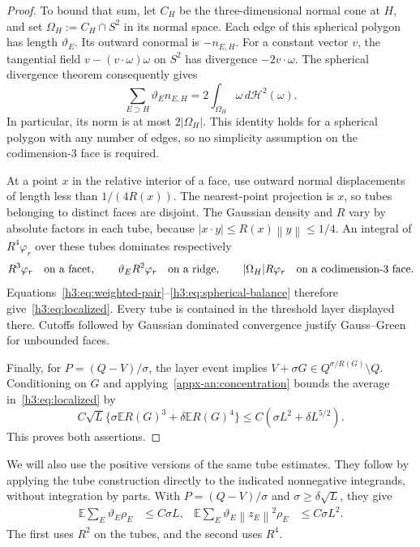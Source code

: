 \documentclass[11pt,letterpaper]{article}
\theoremstyle{remark}
\newcommand{\E}{\mathbb E}
\newcommand{\norm}[1]{\left\lVert#1\right\rVert}
\newcommand{\dd}{\,d}
\begin{document}
\begin{proof}
To bound that sum, let $C_H$ be the three-dimensional normal cone at
$H$, and set $\Omega_H:=C_H\cap S^2$ in its normal space. Each edge
of this spherical polygon has length $\vartheta_E$. Its outward
conormal is $-n_{E,H}$. For a constant vector $v$, the tangential
field $v-(v\cdot\omega)\omega$ on $S^2$ has divergence
$-2v\cdot\omega$. The spherical divergence theorem consequently gives
\begin{equation}
 \sum_{E\supset H}\vartheta_E n_{E,H}
 =2\int_{\Omega_H}\omega\dd\mathcal H^2(\omega).
 \label{h3:eq:spherical-balance}
\end{equation}
In particular, its norm is at most $2|\Omega_H|$. This identity holds
for a spherical polygon with any number of edges, so no simplicity
assumption on the codimension-$3$ face is required.

At a point $x$ in the relative interior of a face, use outward normal
displacements of length less than $1/(4R(x))$. The nearest-point
projection is $x$, so tubes belonging to distinct faces are disjoint.
The Gaussian density and $R$ vary by absolute factors in each tube,
because $|x\cdot y|\le R(x)\norm y\le1/4$.
An integral of $R^4\varphi_r$ over these tubes dominates respectively
\[
 R^3\varphi_r\quad\hbox{on a facet},\qquad
 \vartheta_E R^2\varphi_r\quad\hbox{on a ridge},\qquad
 |\Omega_H|R\varphi_r\quad\hbox{on a codimension-$3$ face}.
\]
Equations~\eqref{h3:eq:weighted-pair}--\eqref{h3:eq:spherical-balance}
therefore give~\eqref{h3:eq:localized}. Every tube is contained in the
threshold layer displayed there. Cutoffs followed by Gaussian dominated
convergence justify Gauss--Green for unbounded faces.

Finally, for $P=(Q-V)/\sigma$, the layer event implies
$V+\sigma G\in Q^{\sigma/R(G)}\setminus Q$.
Conditioning on $G$ and applying~\eqref{appx-an:concentration} bounds
the average in~\eqref{h3:eq:localized} by
\[
 C\sqrt L\{\sigma\E R(G)^3+\delta\E R(G)^4\}
 \le C(\sigma L^2+\delta L^{5/2}).
\]
This proves both assertions.
\end{proof}

We will also use the positive versions of the same tube estimates.
They follow by applying the tube construction directly to the indicated
nonnegative integrands, without integration by parts. With $P=(Q-V)/\sigma$
and $\sigma\ge\delta\sqrt L$, they give
\begin{align}
 \E\sum_E\vartheta_E\rho_E&\le C\sigma L,
 &\E\sum_E\vartheta_E\norm{z_E}^2\rho_E&\le C\sigma L^2.
 \label{h3:eq:positive-edge}
\end{align}
The first uses $R^2$ on the tubes, and the second uses $R^4$.
\end{document}
